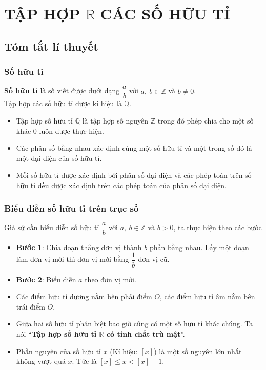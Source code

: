 \section{TẬP HỢP $\mathbb{R}$ CÁC SỐ HỮU TỈ}
\subsection{Tóm tắt lí thuyết}
\subsubsection{Số hữu tỉ}
\begin{dn}
\textbf{Số hữu tỉ} là số viết được dưới dạng $\dfrac{a}{b}$ với $a,\ b\in\mathbb{Z}$ và $b\neq 0$.\\
Tập hợp các số hữu tỉ được kí hiệu là $\mathbb{Q}$.
\end{dn}

\begin{nx}
		\begin{itemize}
		\item Tập hợp số hữu tỉ $\mathbb{Q}$ là tập hợp số nguyên $\mathbb{Z}$ trong đó phép chia cho một số khác $0$ luôn được thực hiện.
		\item Các phân số bằng nhau xác định cùng một số hữu tỉ và một trong số đó là một đại diện của số hữu tỉ.
		\item Mỗi số hữu tỉ được xác định bởi phân số đại diện và các phép toán trên số hữu tỉ đều được xác định trên các phép toán của phân số đại diện.
	\end{itemize}
\end{nx}
\subsubsection{Biểu diễn số hữu tỉ trên trục số}
Giả sử cần biểu diễn số hữu tỉ $\dfrac{a}{b}$ với $a,\ b\in\mathbb{Z}$ và $b> 0$, ta thực hiện theo các bước
\begin{itemize}
	\item \textbf{Bước 1}: Chia đoạn thẳng đơn vị thành $b$ phần bằng nhau. Lấy một đoạn làm đơn vị mới thì đơn vị mới bằng $\dfrac{1}{b}$ đơn vị cũ.
	\item \textbf{Bước 2}: Biểu diễn $a$ theo đơn vị mới.
\end{itemize}

\begin{nx}
	\begin{itemize}
	\item Các điểm hữu tỉ dương nằm bên phải điểm $O$, các điểm hữu tỉ âm nằm bên trái điểm $O$.
	\item Giữa hai số hữu tỉ phân biệt bao giờ cũng có một số hữu tỉ khác chúng. Ta nói ``\textbf{Tập hợp số hữu tỉ $\mathbb{R}$ có tính chất trù mật}''.
	\item Phần nguyên của số hữu tỉ $x$ (Kí hiệu: $[x]$) là một số nguyên lớn nhất không vượt quá $x$. Tức là $[x]\leq x<[x]+1$.
\end{itemize}
\end{nx}


